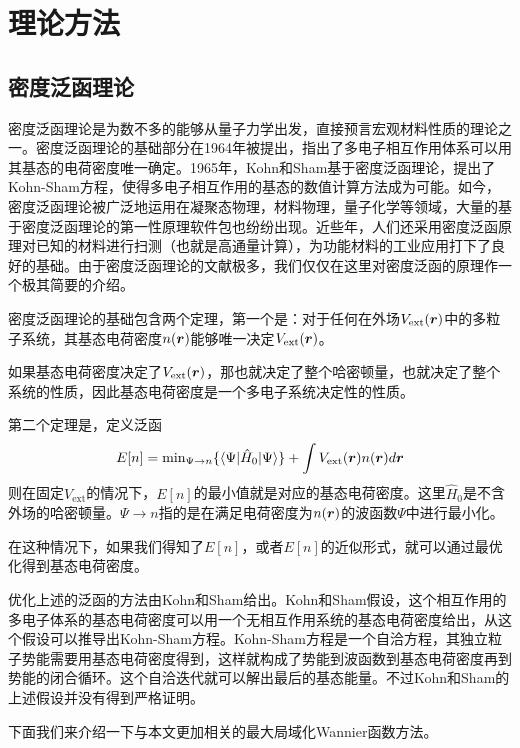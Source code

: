 \chapter{理论方法}
\label{cha:method}

\section{密度泛函理论}

密度泛函理论是为数不多的能够从量子力学出发，直接预言宏观材料性质的理论之一。密度泛函理论的基础部分在1964年被提出\cite{hohenberg_inhomogeneous_1964}，指出了多电子相互作用体系可以用其基态的电荷密度唯一确定。1965年，Kohn和Sham\cite{kohn_self-consistent_1965}基于密度泛函理论，提出了Kohn-Sham方程，使得多电子相互作用的基态的数值计算方法成为可能。如今，密度泛函理论被广泛地运用在凝聚态物理，材料物理，量子化学等领域，大量的基于密度泛函理论的第一性原理软件包也纷纷出现。近些年，人们还采用密度泛函原理对已知的材料进行扫测（也就是高通量计算），为功能材料的工业应用打下了良好的基础。由于密度泛函理论的文献极多，我们仅仅在这里对密度泛函的原理作一个极其简要的介绍。

密度泛函理论的基础包含两个定理，第一个是：对于任何在外场$V_{\text{ext}}(\boldsymbol{r})$中的多粒子系统，其基态电荷密度$n(\boldsymbol{r})$能够唯一决定$V_{\text{ext}}(\boldsymbol{r})$。

如果基态电荷密度决定了$V_{\text{ext}}(\boldsymbol{r})$，那也就决定了整个哈密顿量，也就决定了整个系统的性质，因此基态电荷密度是一个多电子系统决定性的性质。

第二个定理是，定义泛函
\begin{equation}
    E[n] = \text{min}_{\Psi\to n} \{\langle\Psi|\hat{H}_0|\Psi\rangle\}+\int V_\text{ext}(\boldsymbol{r}) n(\boldsymbol{r}) d\boldsymbol{r}
\end{equation}
则在固定$V_\text{ext}$的情况下，$E[n]$的最小值就是对应的基态电荷密度。这里$\hat{H}_0$是不含外场的哈密顿量。$\Psi\to n$指的是在满足电荷密度为$n(\boldsymbol{r})$的波函数$\Psi$中进行最小化。

在这种情况下，如果我们得知了$E[n]$，或者$E[n]$的近似形式，就可以通过最优化得到基态电荷密度。

优化上述的泛函的方法由Kohn和Sham给出。Kohn和Sham假设，这个相互作用的多电子体系的基态电荷密度可以用一个无相互作用系统的基态电荷密度给出，从这个假设可以推导出Kohn-Sham方程。Kohn-Sham方程是一个自洽方程，其独立粒子势能需要用基态电荷密度得到，这样就构成了势能到波函数到基态电荷密度再到势能的闭合循环。这个自洽迭代就可以解出最后的基态能量。不过Kohn和Sham的上述假设并没有得到严格证明。

下面我们来介绍一下与本文更加相关的最大局域化Wannier函数方法。

